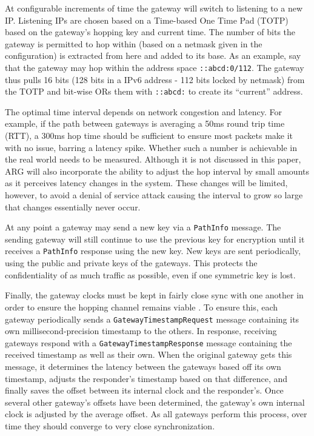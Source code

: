 \par At configurable increments of time the gateway will switch to listening to a new IP. Listening IPs are chosen based on a Time-based One Time Pad (TOTP) \cite{rfc6238} based on the gateway's hopping key and current time. The number of bits the gateway is permitted to hop within (based on a netmask given in the configuration) is extracted from here and added to its base. As an example, say that the gateway may hop within the address space \texttt{::abcd:0/112}. The gateway thus pulls 16 bits (128 bits in a IPv6 address - 112 bits locked by netmask) from the TOTP and bit-wise ORs them with \texttt{::abcd:} to create its ``current'' address.

\par The optimal time interval depends on network congestion and latency. For example, if the path between gateways is averaging a 50ms round trip time (RTT), a 300ms hop time should be sufficient to ensure most packets make it with no issue, barring a latency spike. Whether such a number is achievable in the real world needs to be measured. Although it is not discussed in this paper, ARG will also incorporate the ability to adjust the hop interval by small amounts as it perceives latency changes in the system. These changes will be limited, however, to avoid a denial of service attack causing the interval to grow so large that changes essentially never occur.

\par At any point a gateway may send a new key via a \texttt{PathInfo} message. The sending gateway will still continue to use the previous key for encryption until it receives a \texttt{PathInfo} response using the new key. New keys are sent periodically, using the public and private keys of the gateways. This protects the confidentiality of as much traffic as possible, even if one symmetric key is lost.

\par Finally, the gateway clocks must be kept in fairly close sync with one another in order to ensure the hopping channel remains viable \cite{SandiaDynat, HopProactiveDef}. To ensure this, each gateway periodically sends a \texttt{GatewayTimestampRequest} message containing its own millisecond-precision timestamp to the others. In response, receiving gateways respond with a \texttt{GatewayTimestampResponse} message containing the received timestamp as well as their own. When the original gateway gets this message, it determines the latency between the gateways based off its own timestamp, adjusts the responder's timestamp based on that difference, and finally saves the offset between its internal clock and the responder's. Once several other gateway's offsets have been determined, the gateway's own internal clock is adjusted by the average offset. As all gateways perform this process, over time they should converge to very close synchronization.


